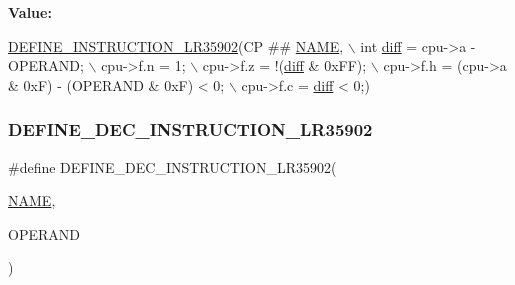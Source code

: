 {\bfseries Value\+:}
\begin{DoxyCode}
\mbox{\hyperlink{isa-lr35902_8c_a3128fc43c5d01e8b51f67901c0b4b5ef}{DEFINE\_INSTRUCTION\_LR35902}}(CP ## \mbox{\hyperlink{inflate_8h_a164ea0159d5f0b5f12a646f25f99eceaa67bc2ced260a8e43805d2480a785d312}{NAME}}, \(\backslash\)
        \textcolor{keywordtype}{int} \mbox{\hyperlink{isa-lr35902_8c_a65f3a8178e1f997a7a19a988bb0f4e1a}{diff}} = cpu->a - OPERAND; \(\backslash\)
        cpu->f.n = 1; \(\backslash\)
        cpu->f.z = !(\mbox{\hyperlink{isa-lr35902_8c_a65f3a8178e1f997a7a19a988bb0f4e1a}{diff}} & 0xFF); \(\backslash\)
        cpu->f.h = (cpu->a & 0xF) - (OPERAND & 0xF) < 0; \(\backslash\)
        cpu->f.c = \mbox{\hyperlink{isa-lr35902_8c_a65f3a8178e1f997a7a19a988bb0f4e1a}{diff}} < 0;)
\end{DoxyCode}
\mbox{\label{isa-lr35902_8c_a746ff31b6713bdf629b4fed43f7f674d}} 
\subsubsection{\texorpdfstring{D\+E\+F\+I\+N\+E\+\_\+\+D\+E\+C\+\_\+\+I\+N\+S\+T\+R\+U\+C\+T\+I\+O\+N\+\_\+\+L\+R35902}{DEFINE\_DEC\_INSTRUCTION\_LR35902}}
{\footnotesize\ttfamily \#define D\+E\+F\+I\+N\+E\+\_\+\+D\+E\+C\+\_\+\+I\+N\+S\+T\+R\+U\+C\+T\+I\+O\+N\+\_\+\+L\+R35902(\begin{DoxyParamCaption}\item[{}]{\mbox{\hyperlink{inflate_8h_a164ea0159d5f0b5f12a646f25f99eceaa67bc2ced260a8e43805d2480a785d312}{N\+A\+ME}},  }\item[{}]{O\+P\+E\+R\+A\+ND }\end{DoxyParamCaption})}

